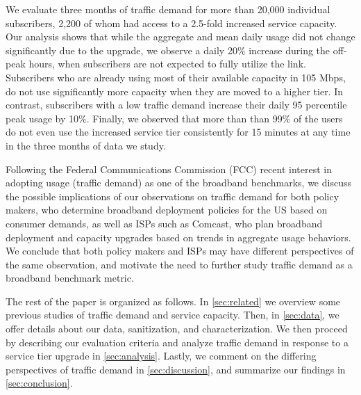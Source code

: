 We evaluate three months of traffic demand for more than 20,000 
individual subscribers, 2,200 of whom had access to a 2.5-fold increased 
service capacity. Our analysis shows that while the aggregate and mean daily 
usage did not change significantly due to the upgrade, we observe a daily 20\% 
increase during the off-peak hours, when subscribers are not expected to fully 
utilize the link. Subscribers who are already using most of their 
available capacity in 105 Mbps, do not use significantly more capacity when
they are moved to a higher tier. In contrast, subscribers with a low traffic demand 
increase their daily 95 percentile peak usage by 10\%. Finally, we observed 
that more than than 99\% of the users do not even use the increased service 
tier consistently for 15 minutes at any time in the three months of data we 
study.

Following the Federal Communications Commission (FCC) recent interest in 
adopting usage (traffic demand) as one of the broadband benchmarks, we discuss 
the possible implications of our observations on traffic demand for both policy 
makers, who determine broadband deployment policies for the US based on consumer 
demands, as well as ISPs such as Comcast, who plan broadband deployment and 
capacity upgrades based on trends in aggregate usage behaviors. We conclude that 
both policy makers and ISPs may have different perspectives of the same 
observation, and motivate the need to further study traffic demand as a 
broadband benchmark metric.

The rest of the paper is organized as follows. In \autoref{sec:related} we 
overview some previous studies of traffic demand and service capacity. Then, in 
\autoref{sec:data}, we offer details about our data, sanitization, and 
characterization. We then proceed by describing our evaluation criteria and 
analyze traffic demand in response to a service tier upgrade in 
\autoref{sec:analysis}.
Lastly, we comment on the differing perspectives of traffic demand in 
\autoref{sec:discussion}, and summarize our findings in 
\autoref{sec:conclusion}.
